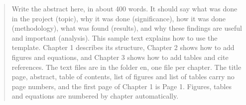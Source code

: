 \begin{abstract}
Write the abstract here, in about 400 words. It should say what was done in the project (topic), why it was done (significance), how it was done (methodology), what was found (results), and why these findings are useful and important (analysis). This sample text explains how to use the template. Chapter 1 describes its structure, Chapter 2 shows how to add figures and equations, and Chapter 3 shows how to add tables and cite references. The text files are in the folder en, one file per chapter. The title page, abstract, table of contents, list of figures and list of tables carry no page numbers, and the first page of Chapter 1 is Page 1. Figures, tables and equations are numbered by chapter automatically.
\end{abstract}
